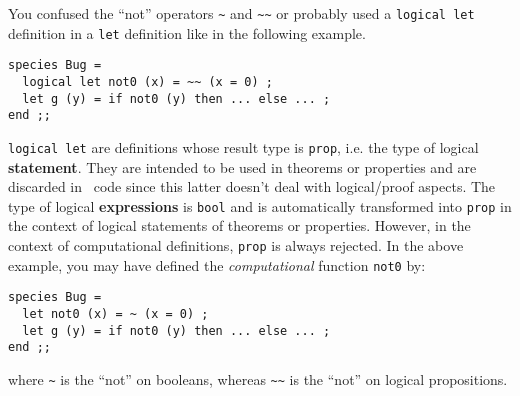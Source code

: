 \documentclass[10pt,a4paper]{article}
\begin{document}
\medskip
{}
\begin{adjustwidth}{2em}{0em}
You confused the ``not'' operators \lstinline"~" and \lstinline"~~" or
probably used a \lstinline"logical let" definition in a \lstinline"let"
definition like in the following example.

{\small
\begin{lstlisting}
species Bug =
  logical let not0 (x) = ~~ (x = 0) ;
  let g (y) = if not0 (y) then ... else ... ;
end ;;
\end{lstlisting}}

\lstinline"logical let" are definitions whose result type is {\tt prop}, i.e.
the type of logical {\bf statement}. They are intended to be used in theorems
or properties and are discarded in \ocaml\ code since this latter doesn't
deal with logical/proof aspects. The type of logical {\bf expressions} is
{\tt bool} and is automatically transformed into {\tt prop} in the context
of logical statements of theorems or properties. However, in the context of
computational definitions, {\tt prop} is always rejected. In the above example,
you may have defined the {\em computational} function {\tt not0} by:

{\small
\begin{lstlisting}
species Bug =
  let not0 (x) = ~ (x = 0) ;
  let g (y) = if not0 (y) then ... else ... ;
end ;;
\end{lstlisting}}

\noindent where \lstinline"~" is the ``not'' on booleans, whereas
\lstinline"~~" is the ``not'' on logical propositions.
\end{adjustwidth}
\end{document}
